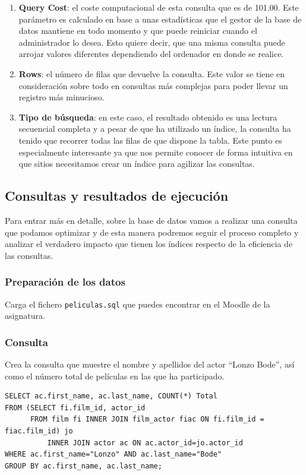 \documentclass[a4paper]{article}
\begin{document}
\begin{enumerate}
    \item \textbf{Query Cost}: el coste computacional de esta consulta que es de 101.00.  Este parámetro es calculado en base a unas estadísticas que el gestor de la base de datos mantiene en todo momento y que puede reiniciar cuando el administrador lo desea. Esto quiere decir, que una misma consulta puede arrojar valores diferentes dependiendo del ordenador en donde se realice. 
    \item \textbf{Rows}: el número de filas que devuelve la consulta. Este valor se tiene en consideración sobre todo en consultas más complejas para poder llevar un registro más minucioso.
    \item \textbf{Tipo de búsqueda}: en este caso, el resultado obtenido es una lectura secuencial completa y a pesar de que ha utilizado un índice, la consulta ha tenido que recorrer todas las filas de que dispone la tabla. Este punto es especialmente interesante ya que nos permite conocer de forma intuitiva en que sitios necesitamos crear un índice para agilizar las consultas.
\end{enumerate}

\subsection*{Consultas y resultados de ejecución}

Para entrar más en detalle, sobre la base de datos vamos a realizar una consulta que podamos optimizar y de esta manera podremos seguir el proceso completo y analizar el verdadero impacto que tienen los índices respecto de la eficiencia de las consultas.

\subsubsection*{Preparación de los datos}

Carga el fichero \texttt{peliculas.sql} que puedes encontrar en el Moodle de la asignatura.

\subsubsection*{Consulta}

Crea la consulta que muestre el nombre y apellidos del actor ``Lonzo Bode'', así como el número total de películas en las que ha participado.
    
\begin{verbatim}
SELECT ac.first_name, ac.last_name, COUNT(*) Total
FROM (SELECT fi.film_id, actor_id 
      FROM film fi INNER JOIN film_actor fiac ON fi.film_id = fiac.film_id) jo 
          INNER JOIN actor ac ON ac.actor_id=jo.actor_id
WHERE ac.first_name="Lonzo" AND ac.last_name="Bode"
GROUP BY ac.first_name, ac.last_name;
\end{verbatim} 
\end{document}
